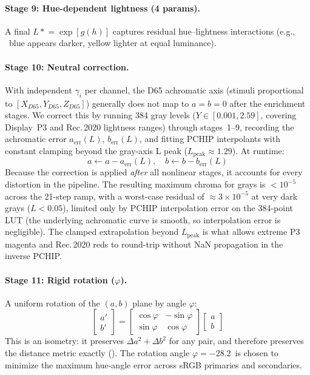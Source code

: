 \documentclass[11pt, twocolumn]{article}
\newcommand{\eg}{e.g.,\,}
\begin{document}
\paragraph{Stage 9: Hue-dependent lightness (4 params).}
A final $L \mathrel{*}= \exp[g(h)]$ captures residual hue--lightness
interactions (\eg\ blue appears darker, yellow lighter at equal
luminance).

\paragraph{Stage 10: Neutral correction.}
With independent $\gamma_i$ per channel, the D65 achromatic axis
(stimuli proportional to $[X_{D65}, Y_{D65}, Z_{D65}]$) generally
does not map to $a\!=\!b\!=\!0$ after the enrichment stages. We
correct this by running 384 gray levels ($Y \in [0.001, 2.59]$,
covering Display~P3 and Rec.\,2020 lightness ranges) through
stages~1--9, recording the achromatic error $a_\mathrm{err}(L)$,
$b_\mathrm{err}(L)$, and fitting PCHIP interpolants with constant
clamping beyond the gray-axis L peak ($L_\mathrm{peak}\!\approx\!1.29$).
At runtime:
\begin{equation}
  a \leftarrow a - a_\mathrm{err}(L), \quad b \leftarrow b - b_\mathrm{err}(L)
  \label{eq:nc}
\end{equation}
Because the correction is applied \emph{after} all nonlinear stages,
it accounts for every distortion in the pipeline. The resulting
maximum chroma for grays is $< 10^{-5}$ across the 21-step ramp, with a worst-case residual of $\approx 3\!\times\!10^{-5}$ at very dark grays ($L\!<\!0.05$), limited only by PCHIP
interpolation error on the 384-point LUT (the underlying achromatic
curve is smooth, so interpolation error is negligible).
The clamped extrapolation beyond $L_\mathrm{peak}$ is what allows
extreme P3 magenta and Rec.\,2020 reds to round-trip without
NaN propagation in the inverse PCHIP.

\paragraph{Stage 11: Rigid rotation ($\varphi$).}
A uniform rotation of the $(a,b)$ plane by angle $\varphi$:
\begin{equation}
  \begin{bmatrix} a' \\ b' \end{bmatrix} = \begin{bmatrix} \cos\varphi & -\sin\varphi \\ \sin\varphi & \cos\varphi \end{bmatrix} \begin{bmatrix} a \\ b \end{bmatrix}
  \label{eq:rotation}
\end{equation}
This is an isometry: it preserves $\Delta a^2 + \Delta b^2$ for any
pair, and therefore preserves the distance metric exactly
(). The rotation angle
$\varphi = -28.2$\textdegree\ is chosen to minimize the maximum
hue-angle error across sRGB primaries and secondaries.
\end{document}
